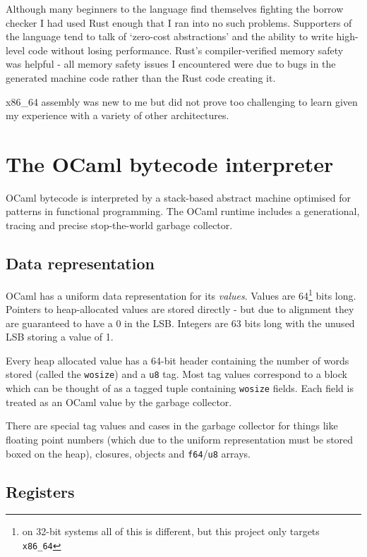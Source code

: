 Although many beginners to the language find themselves fighting the borrow checker I had used Rust
enough that I ran into no such problems. Supporters of the language tend to talk of `zero-cost
abstractions' and the ability to write high-level code without losing performance. Rust's
compiler-verified memory safety was helpful - all memory safety issues I encountered were due to
bugs in the generated machine code rather than the Rust code creating it.

x86\_64 assembly was new to me but did not prove too challenging to learn given my experience with
a variety of other architectures.

\section{The OCaml bytecode interpreter}

OCaml bytecode is interpreted by a stack-based abstract machine optimised for patterns in
functional programming. The OCaml runtime includes a generational, tracing and precise
stop-the-world garbage collector.

\subsection{Data representation}

OCaml has a uniform data representation for its \emph{values}. Values are 64\footnote{on 32-bit
    systems all of this is different, but this project only targets \texttt{x86\_64}} bits long.
Pointers to heap-allocated values are stored directly - but due to alignment they are guaranteed to
have a 0 in
the LSB. Integers are 63 bits long with the unused LSB storing a value of 1.

Every heap allocated value has a 64-bit header containing the number of words stored (called
the \texttt{wosize}) and a \texttt{u8} tag. Most tag values correspond to a block which can be
thought of as a tagged tuple containing \texttt{wosize} fields. Each field is treated as an OCaml
value by the garbage collector.

There are special tag values and cases in the garbage collector for things like floating point
numbers (which due to the uniform representation must be stored boxed on the heap),
closures, objects and \texttt{f64}/\texttt{u8} arrays.

\subsection{Registers}

